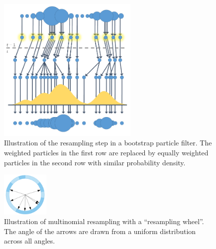 \begin{figure}[hbt!]
    \centering
    \includegraphics[width=0.6\textwidth]{figures/resampling.png}
    \caption{Illustration of the resampling step in a bootstrap particle filter. The weighted particles in the first row are replaced by equally weighted particles in the second row with similar probability density.\cite{resampling_image}}
    \label{fig:resampling}
\end{figure}


\begin{figure}[hbt!]
    \centering
    \includegraphics[width=0.2\textwidth]{figures/multinomial.png}
    \caption{Illustration of multinomial resampling with a ``resampling wheel''. The angle of the arrows are drawn from a uniform distribution across all angles.\cite{parallel_resampling}}
    \label{fig:pf_resampling}
\end{figure}
